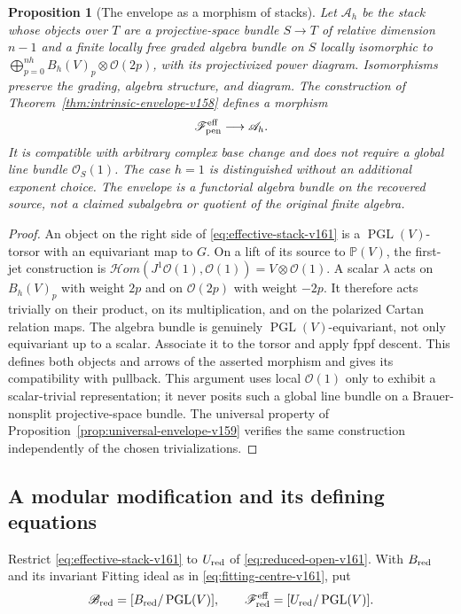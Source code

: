 \documentclass[11pt,reqno]{amsart}
\numberwithin{equation}{section}
\newtheorem{proposition}[theorem]{Proposition}
\theoremstyle{definition}\newtheorem{definition}[theorem]{Definition}
\theoremstyle{remark}\newtheorem{remark}[theorem]{Remark}
\newcommand{\Pj}{\mathbb P}\newcommand{\A}{\mathbb A}
\newcommand{\OO}{\mathcal O}\newcommand{\II}{\mathcal I}
\begin{document}
\begin{proposition}[The envelope as a morphism of stacks]
\label{prop:envelope-stack-v161}
Let $\mathscr A_h$ be the stack whose objects over $T$ are a
projective-space bundle $S\to T$ of relative dimension $n-1$ and a
finite locally free graded algebra bundle on $S$ locally isomorphic
to $\bigoplus_{p=0}^{nh}B_h(V)_p\otimes\OO(2p)$, with its
projectivized power diagram. Isomorphisms preserve the grading,
algebra structure, and diagram. The construction of
Theorem~\ref{thm:intrinsic-envelope-v158} defines a morphism
\[
                \mathscr F_{\rm pen}^{\rm eff}\longrightarrow\mathscr A_h.
\]
It is compatible with arbitrary complex base change and does not
require a global line bundle $\OO_S(1)$. The case $h=1$ is
distinguished without an additional exponent choice. The envelope
is a functorial algebra bundle on the recovered source, not a
claimed subalgebra or quotient of the original finite algebra.
\end{proposition}
\begin{proof}
An object on the right side of \eqref{eq:effective-stack-v161} is a
$\operatorname{PGL}(V)$-torsor with an equivariant map to $G$.
On a lift of its source to $\Pj(V)$, the first-jet construction is
$\mathcal Hom(J^1\OO(1),\OO(1))=V\otimes\OO(1)$. A scalar
$\lambda$ acts on $B_h(V)_p$ with weight $2p$ and on $\OO(2p)$
with weight $-2p$. It therefore acts trivially on their product,
on its multiplication, and on the polarized Cartan relation maps.
The algebra bundle is genuinely $\operatorname{PGL}(V)$-equivariant,
not only equivariant up to a scalar. Associate it to the torsor and
apply fppf descent. This defines both objects and arrows of the
asserted morphism and gives its compatibility with pullback. This
argument uses local $\OO(1)$ only to exhibit a scalar-trivial
representation; it never posits such a global line bundle on a
Brauer-nonsplit projective-space bundle. The universal property of
Proposition~\ref{prop:universal-envelope-v159} verifies the same
construction independently of the chosen trivializations.
\end{proof}

\subsection{A modular modification and its defining equations}
Restrict \eqref{eq:effective-stack-v161} to $U_{\rm red}$ of
\eqref{eq:reduced-open-v161}. With $B_{\rm red}$ and its invariant
Fitting ideal as in \eqref{eq:fitting-centre-v161}, put
\begin{equation}\label{eq:boundary-stack-v161}
 \mathscr B_{\rm red}=[B_{\rm red}/\operatorname{PGL}(V)],\qquad
 \mathscr F_{\rm red}^{\rm eff}=[U_{\rm red}/\operatorname{PGL}(V)].
\end{equation}
\end{document}
